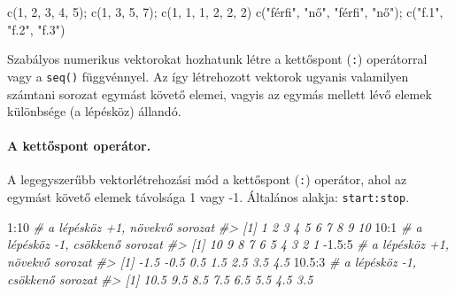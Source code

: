 \documentclass[
]{book}
\newenvironment{Shaded}{\begin{snugshade}}{\end{snugshade}}
\newcommand{\CommentTok}[1]{\textcolor[rgb]{0.56,0.35,0.01}{\textit{#1}}}
\newcommand{\DecValTok}[1]{\textcolor[rgb]{0.00,0.00,0.81}{#1}}
\newcommand{\FloatTok}[1]{\textcolor[rgb]{0.00,0.00,0.81}{#1}}
\newcommand{\FunctionTok}[1]{\textcolor[rgb]{0.00,0.00,0.00}{#1}}
\newcommand{\NormalTok}[1]{#1}
\newcommand{\SpecialCharTok}[1]{\textcolor[rgb]{0.00,0.00,0.00}{#1}}
\newcommand{\StringTok}[1]{\textcolor[rgb]{0.31,0.60,0.02}{#1}}
\begin{document}
\begin{Shaded}
\begin{Highlighting}[]
\FunctionTok{c}\NormalTok{(}\DecValTok{1}\NormalTok{, }\DecValTok{2}\NormalTok{, }\DecValTok{3}\NormalTok{, }\DecValTok{4}\NormalTok{, }\DecValTok{5}\NormalTok{); }\FunctionTok{c}\NormalTok{(}\DecValTok{1}\NormalTok{, }\DecValTok{3}\NormalTok{, }\DecValTok{5}\NormalTok{, }\DecValTok{7}\NormalTok{); }\FunctionTok{c}\NormalTok{(}\DecValTok{1}\NormalTok{, }\DecValTok{1}\NormalTok{, }\DecValTok{1}\NormalTok{, }\DecValTok{2}\NormalTok{, }\DecValTok{2}\NormalTok{, }\DecValTok{2}\NormalTok{)}
\FunctionTok{c}\NormalTok{(}\StringTok{"férfi"}\NormalTok{, }\StringTok{"nő"}\NormalTok{, }\StringTok{"férfi"}\NormalTok{, }\StringTok{"nő"}\NormalTok{); }\FunctionTok{c}\NormalTok{(}\StringTok{"f.1"}\NormalTok{, }\StringTok{"f.2"}\NormalTok{, }\StringTok{"f.3"}\NormalTok{)}
\end{Highlighting}
\end{Shaded}

Szabályos numerikus vektorokat hozhatunk létre a kettőspont (\texttt{:}) operátorral vagy a \texttt{seq()} függvénnyel. Az így létrehozott vektorok ugyanis valamilyen számtani sorozat egymást követő elemei, vagyis az egymás mellett lévő elemek különbsége (a lépésköz) állandó.

\hypertarget{a-kettux151spont-operuxe1tor.}{%
\paragraph{A kettőspont operátor.}\label{a-kettux151spont-operuxe1tor.}}

A legegyszerűbb vektorlétrehozási mód a kettőspont (\texttt{:}) operátor, ahol az egymást követő elemek távolsága 1 vagy -1. Általános alakja: \texttt{start:stop}.

\begin{Shaded}
\begin{Highlighting}[]
\DecValTok{1}\SpecialCharTok{:}\DecValTok{10}    \CommentTok{\# a lépésköz +1, növekvő sorozat}
\CommentTok{\#\textgreater{}  [1]  1  2  3  4  5  6  7  8  9 10}
\DecValTok{10}\SpecialCharTok{:}\DecValTok{1}    \CommentTok{\# a lépésköz {-}1, csökkenő sorozat}
\CommentTok{\#\textgreater{}  [1] 10  9  8  7  6  5  4  3  2  1}
\SpecialCharTok{{-}}\FloatTok{1.5}\SpecialCharTok{:}\DecValTok{5}  \CommentTok{\# a lépésköz +1, növekvő sorozat}
\CommentTok{\#\textgreater{} [1] {-}1.5 {-}0.5  0.5  1.5  2.5  3.5  4.5}
\FloatTok{10.5}\SpecialCharTok{:}\DecValTok{3}  \CommentTok{\# a lépésköz {-}1, csökkenő sorozat}
\CommentTok{\#\textgreater{} [1] 10.5  9.5  8.5  7.5  6.5  5.5  4.5  3.5}
\end{Highlighting}
\end{Shaded}
\end{document}
